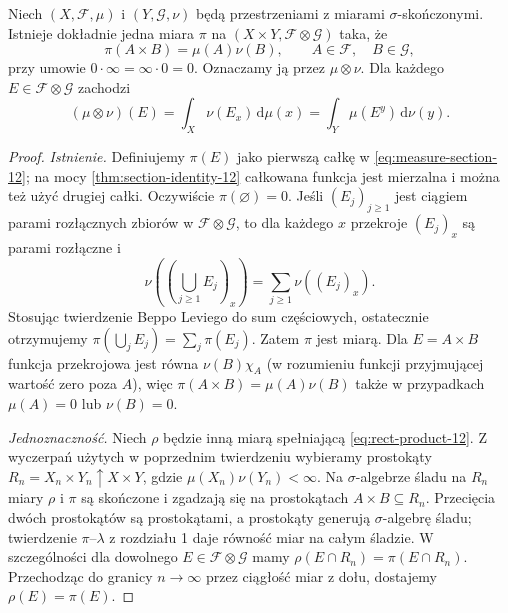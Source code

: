 \begin{twierdzenie}
\label{thm:product-measure-12}
Niech $(X,\mathcal F,\mu)$ i $(Y,\mathcal G,\nu)$
będą przestrzeniami z miarami $\sigma$-skończonymi.
Istnieje dokładnie jedna miara $\pi$ na
$(X\times Y,\mathcal F\otimes\mathcal G)$ taka, że
\begin{equation}\label{eq:rect-product-12}
\pi(A\times B)=\mu(A)\nu(B),
\qquad A\in\mathcal F,\quad B\in\mathcal G,
\end{equation}
przy umowie $0\cdot\infty=\infty\cdot0=0$.
Oznaczamy ją przez $\mu\otimes\nu$.
Dla każdego $E\in\mathcal F\otimes\mathcal G$ zachodzi
\begin{equation}\label{eq:measure-section-12}
(\mu\otimes\nu)(E)=
\int_X\nu(E_x)\,\mathrm d\mu(x)
=\int_Y\mu(E^y)\,\mathrm d\nu(y).
\end{equation}
\end{twierdzenie}
\begin{proof}
\emph{Istnienie.}
Definiujemy $\pi(E)$ jako pierwszą całkę
w \eqref{eq:measure-section-12}; na mocy
\ref{thm:section-identity-12} całkowana funkcja jest
mierzalna i można też użyć drugiej całki.
Oczywiście $\pi(\varnothing)=0$.
Jeśli $(E_j)_{j\ge1}$ jest ciągiem parami
rozłącznych zbiorów w $\mathcal F\otimes\mathcal G$,
to dla każdego $x$ przekroje $(E_j)_x$ są parami
rozłączne i
\[
\nu\left(\left(\bigcup_{j\ge1}E_j\right)_x\right)
=\sum_{j\ge1}\nu((E_j)_x).
\]
Stosując twierdzenie Beppo Leviego do sum częściowych,
ostatecznie otrzymujemy
$\pi(\bigcup_jE_j)=\sum_j\pi(E_j)$.
Zatem $\pi$ jest miarą.
Dla $E=A\times B$ funkcja przekrojowa jest równa
$\nu(B)\chi_A$ (w rozumieniu funkcji przyjmującej
wartość zero poza $A$), więc
$\pi(A\times B)=\mu(A)\nu(B)$ także w przypadkach
$\mu(A)=0$ lub $\nu(B)=0$.

\emph{Jednoznaczność.}
Niech $\rho$ będzie inną miarą spełniającą
\eqref{eq:rect-product-12}. Z wyczerpań użytych
w poprzednim twierdzeniu wybieramy prostokąty
$R_n=X_n\times Y_n\uparrow X\times Y$, gdzie
$\mu(X_n)\nu(Y_n)<\infty$.
Na $\sigma$-algebrze śladu na $R_n$ miary
$\rho$ i $\pi$ są skończone i zgadzają się na
prostokątach $A\times B\subseteq R_n$.
Przecięcia dwóch prostokątów są prostokątami,
a prostokąty generują $\sigma$-algebrę śladu;
twierdzenie $\pi$--$\lambda$ z rozdziału 1 daje
równość miar na całym śladzie.
W szczególności dla dowolnego
$E\in\mathcal F\otimes\mathcal G$ mamy
$\rho(E\cap R_n)=\pi(E\cap R_n)$.
Przechodząc do granicy $n\to\infty$ przez
ciągłość miar z dołu, dostajemy $\rho(E)=\pi(E)$.
\end{proof}

